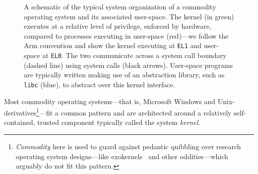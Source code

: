 \documentclass[a4paper, UKenglish, cleveref, autoref, thm-restate, colorlinks]{lipics-v2021}
\begin{document}
\begin{figure}
\caption{A schematic of the typical system organization of a commodity operating system and its associated user-space.
The kernel (in green) executes at a relative level of privilege, enforced by hardware, compared to processes executing in user-space (red)---we follow the Arm convention and show the kernel executing at \texttt{EL1} and user-space at \texttt{EL0}.
The two communicate across a system call boundary (dashed line) using system calls (black arrows).
User-space programs are typically written making use of an abstraction library, such as \texttt{libc} (blue), to abstract over this kernel interface.}
\label{fig.operating-system.schematic}
\end{figure}

Most commodity operating systems---that is, Microsoft Windows and Unix-derivatives\footnote{\emph{Commodity} here is used to guard against pedantic quibbling over research operating system designs---like exokernels~\cite{engler95exokernel} and other oddities---which arguably do not fit this pattern.}---fit a common pattern and are architected around a relatively self-contained, trusted component typically called the system \emph{kernel}.
\end{document}
